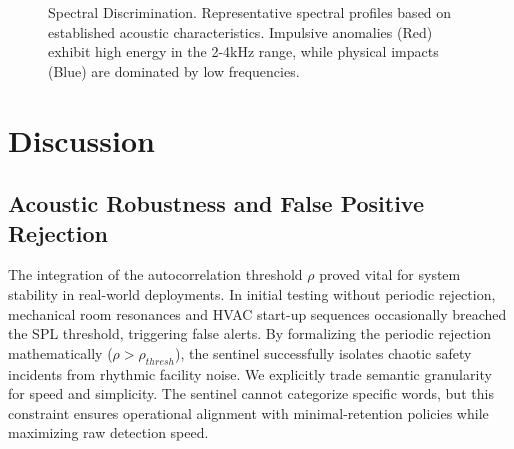 \documentclass[conference]{IEEEtran}
\begin{document}
\begin{figure}[htbp]
\centering
{}
\caption{Spectral Discrimination. Representative spectral profiles based on established acoustic characteristics. Impulsive anomalies (Red) exhibit high energy in the 2-4kHz range, while physical impacts (Blue) are dominated by low frequencies.}
\label{fig:spectral}
\end{figure}

\section{Discussion}

\subsection{Acoustic Robustness and False Positive Rejection}
The integration of the autocorrelation threshold $\rho$ proved vital for system stability in real-world deployments. In initial testing without periodic rejection, mechanical room resonances and HVAC start-up sequences occasionally breached the SPL threshold, triggering false alerts. By formalizing the periodic rejection mathematically ($ \rho > \rho_{thresh} $), the sentinel successfully isolates chaotic safety incidents from rhythmic facility noise. We explicitly trade semantic granularity for speed and simplicity. The sentinel cannot categorize specific words, but this constraint ensures operational alignment with minimal-retention policies while maximizing raw detection speed. 
\end{document}
